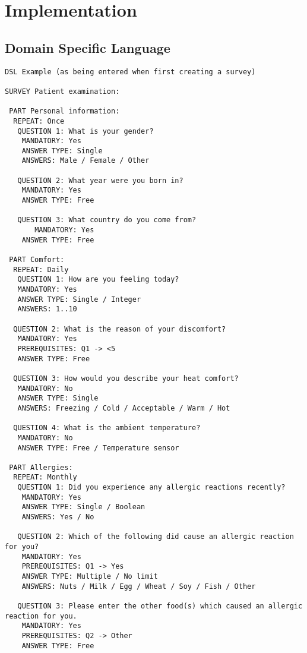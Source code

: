 \chapter{Implementation}
\label{chap:implementation}

\section{Domain Specific Language}
\label{sec:dsl}

\begin{verbatim}
DSL Example (as being entered when first creating a survey)

SURVEY Patient examination:

 PART Personal information:
  REPEAT: Once
   QUESTION 1: What is your gender?
    MANDATORY: Yes
    ANSWER TYPE: Single 
    ANSWERS: Male / Female / Other
      
   QUESTION 2: What year were you born in?
    MANDATORY: Yes
    ANSWER TYPE: Free

   QUESTION 3: What country do you come from?
       MANDATORY: Yes
    ANSWER TYPE: Free
      
 PART Comfort:
  REPEAT: Daily
   QUESTION 1: How are you feeling today?
   MANDATORY: Yes
   ANSWER TYPE: Single / Integer
   ANSWERS: 1..10
   
  QUESTION 2: What is the reason of your discomfort?
   MANDATORY: Yes
   PREREQUISITES: Q1 -> <5
   ANSWER TYPE: Free
 
  QUESTION 3: How would you describe your heat comfort?
   MANDATORY: No
   ANSWER TYPE: Single
   ANSWERS: Freezing / Cold / Acceptable / Warm / Hot
 
  QUESTION 4: What is the ambient temperature?
   MANDATORY: No
   ANSWER TYPE: Free / Temperature sensor
      
 PART Allergies:  
  REPEAT: Monthly
   QUESTION 1: Did you experience any allergic reactions recently?
    MANDATORY: Yes
    ANSWER TYPE: Single / Boolean
    ANSWERS: Yes / No
 
   QUESTION 2: Which of the following did cause an allergic reaction for you?
    MANDATORY: Yes
    PREREQUISITES: Q1 -> Yes
    ANSWER TYPE: Multiple / No limit
    ANSWERS: Nuts / Milk / Egg / Wheat / Soy / Fish / Other
 
   QUESTION 3: Please enter the other food(s) which caused an allergic reaction for you.
    MANDATORY: Yes
    PREREQUISITES: Q2 -> Other
    ANSWER TYPE: Free
\end{verbatim}


